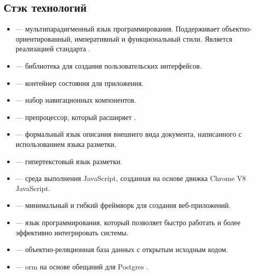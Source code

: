 \subsection{Стэк технологий}
\begin{itemize}
    \item \textcite{wiki:js} --- мультипарадигменный язык программирования. Поддерживает объектно-ориентированный, императивный и функциональный стили. Является реализацией стандарта \textcite{wiki:es}.
    \item \textcite{react} --- \textcite{wiki:js} библиотека для создания пользовательских интерфейсов.
    \item \textcite{redux} --- контейнер состояния для \textcite{wiki:js} приложения.
    \item \textcite{react-router} --- набор навигационных компонентов.
    \item \textcite{scss} --- препроцессор, который расширяет \textcite{wiki:css}.
    \item \textcite{wiki:css} --- формальный язык описания внешнего вида документа, написанного с использованием языка разметки.
    \item \textcite{wiki:html} --- гипертекстовый язык разметки.
    \item \textcite{node.js} --- среда выполнения JavaScript, созданная на основе движка Chrome V8 JavaScript.
    \item \textcite{express} --- минимальный и гибкий \textcite{node.js} фреймворк для создания веб-приложений.
    \item \textcite{python} --- язык программирования, который позволяет быстро работать и более эффективно интегрировать системы.
    \item \textcite{postgres} --- объектно-реляционная база данных с открытым исходным кодом.
    \item \textcite{seqorm} --- \textcite{node.js} \acrshort{orm} на основе обещаний для Postgres \textcite{postgres}.
\end{itemize}

